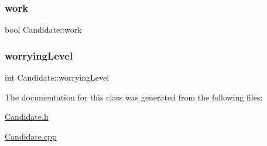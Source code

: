 \hypertarget{class_candidate_ab0a3583b677b47424e2da3f267a8036a}{}\label{class_candidate_ab0a3583b677b47424e2da3f267a8036a} 
\subsubsection{\texorpdfstring{work}{work}}
{\footnotesize\ttfamily bool Candidate\+::work\hspace{0.3cm}{\ttfamily [private]}}

\hypertarget{class_candidate_a5c05cc634ba4472a0897d2e669f37963}{}\label{class_candidate_a5c05cc634ba4472a0897d2e669f37963} 
\subsubsection{\texorpdfstring{worrying\+Level}{worryingLevel}}
{\footnotesize\ttfamily int Candidate\+::worrying\+Level\hspace{0.3cm}{\ttfamily [private]}}



The documentation for this class was generated from the following files\+:\begin{DoxyCompactItemize}
\item 
\hyperlink{_candidate_8h}{Candidate.\+h}\item 
\hyperlink{_candidate_8cpp}{Candidate.\+cpp}\end{DoxyCompactItemize}
